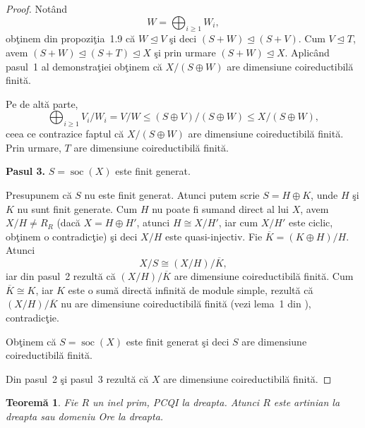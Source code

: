 \documentclass[12pt,a4paper]{book}
\DeclareMathOperator{\soc}{soc}
\newcommand{\ess}{\trianglelefteq}  %
\theoremstyle{plain}
\newtheorem{theorem}{Teoremă}[section] %
\theoremstyle{definition}
\theoremstyle{remark}
\begin{document}
\begin{proof}
Notând
\[
  W = \bigoplus_{i \geq 1} W_i,
\]
obţinem din propoziţia~1.9 că \(W \ess V\) şi deci
\((S + W) \ess (S + V)\). Cum \(V \ess T\), avem
\((S + W) \ess (S + T) \ess X\) şi prin urmare \((S + W) \ess X\).
Aplicând pasul~1 al demonstraţiei obţinem că \(X/(S \oplus W)\) are
dimensiune coireductibilă finită.

Pe de altă parte,
\[
  \bigoplus_{i \geq 1} V_i/W_i = V/W \leq (S \oplus V)/(S \oplus W) \leq X/(S \oplus W),
\]
ceea ce contrazice faptul că \(X/(S \oplus W)\) are dimensiune
coireductibilă finită. Prin urmare, \(T\) are dimensiune
coireductibilă finită.

\medskip
\noindent\textbf{Pasul 3.} \(S = \soc(X)\) este finit generat.

Presupunem că \(S\) nu este finit generat. Atunci putem scrie
\(S = H \oplus K\), unde \(H\) şi \(K\) nu sunt finit generate.
Cum \(H\) nu poate fi sumand direct al lui \(X\), avem \(X/H \neq R_R\)
(dacă \(X = H \oplus H'\), atunci \(H \cong X/H'\), iar cum \(X/H'\) este
ciclic, obţinem o contradicţie) şi deci \(X/H\) este quasi-injectiv.
Fie \(\overline{K} = (K \oplus H)/H\). Atunci
\[
  X/S \cong (X/H)/\overline{K},
\]
iar din pasul~2 rezultă că \((X/H)/\overline{K}\) are dimensiune
coireductibilă finită. Cum \(\overline{K} \cong K\), iar \(K\) este o
sumă directă infinită de module simple, rezultă că
\((X/H)/\overline{K}\) nu are dimensiune coireductibilă finită
(vezi lema~1 din \cite{DiHuWi}), contradicţie.

Obţinem că \(S = \soc(X)\) este finit generat şi deci \(S\) are
dimensiune coireductibilă finită.

\medskip
Din pasul~2 şi pasul~3 rezultă că \(X\) are dimensiune coireductibilă
finită.
\end{proof}

\begin{theorem}\label{thm:6.3}
Fie \(R\) un inel prim, PCQI la dreapta. Atunci \(R\) este artinian la
dreapta sau domeniu Ore la dreapta.
\end{theorem}
\end{document}
